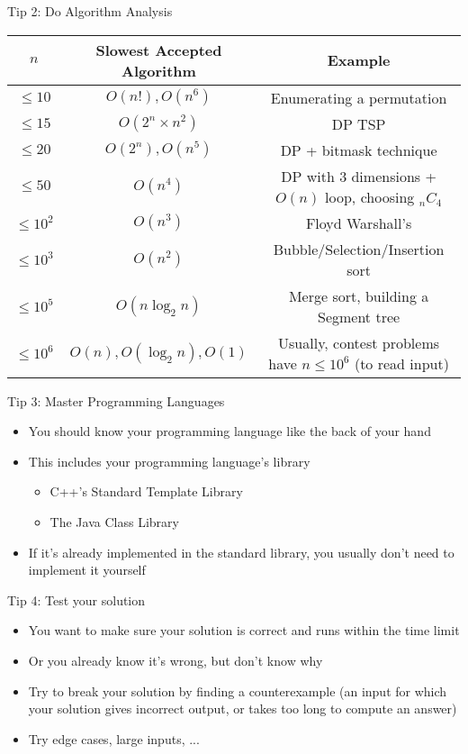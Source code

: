 \documentclass[10pt]{beamer}
\newcommand{\bi}{\begin{itemize}}
\newcommand{\ei}{\end{itemize}}
\begin{document}
\begin{frame}{Tip 2: Do Algorithm Analysis}
    \vspace{10pt}
{
    \scriptsize
    \begin{center}
    \begin{tabular}{c|c|c}
        $n$ & Slowest Accepted Algorithm & Example \\
        \hline
        $\leq 10$ & $O(n!), O(n^6)$ & Enumerating a permutation \\
        $\leq 15$ & $O(2^n\times n^2)$ & DP TSP \\
        $\leq 20$ & $O(2^n), O(n^5)$ & DP + bitmask technique \\
        $\leq 50$ & $O(n^4)$ & DP with 3 dimensions + $O(n)$ loop, choosing  $_nC_4$ \\
        $\leq 10^2$ & $O(n^3)$ & Floyd Warshall's \\
        $\leq 10^3$ & $O(n^2)$ & Bubble/Selection/Insertion sort \\
        $\leq 10^5$ & $O(n\log_2{n})$ & Merge sort, building a Segment tree \\
        $\leq 10^6$ & $O(n), O(\log_2{n}), O(1)$ & Usually, contest problems have $n\leq10^6$ (to read input) \\
    \end{tabular}
    \end{center}
}
\end{frame}

\begin{frame}{Tip 3: Master Programming Languages}
    \bi
        \item You should know your programming language like the back of your hand
        \item This includes your programming language's library
            \bi
                \item C++'s Standard Template Library
                \item The Java Class Library
            \ei
        \item If it's already implemented in the standard library, you usually don't need to implement it yourself
    \ei
\end{frame}

\begin{frame}{Tip 4: Test your solution}
    \bi
        \item You want to make sure your solution is correct and runs within the time limit
        \item Or you already know it's wrong, but don't know why
        \vspace{10pt}
        \item Try to break your solution by finding a counterexample (an input for which your solution gives incorrect output, or takes too long to compute an answer)
        \item Try edge cases, large inputs, ...
    \ei
\end{frame}
\end{document}
